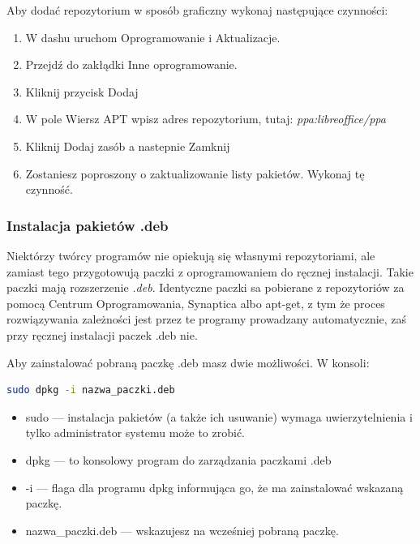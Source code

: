 Aby dodać repozytorium w sposób graficzny wykonaj następujące czynności:
\begin{enumerate}
\item W dashu uruchom \textcolor{ubuntu_orange}{Oprogramowanie i Aktualizacje}.
\item Przejdź do zakłądki \textcolor{ubuntu_orange}{Inne oprogramowanie}.
\item Kliknij przycisk \textcolor{ubuntu_orange}{Dodaj}
\item W pole \textcolor{ubuntu_orange}{Wiersz APT} wpisz adres repozytorium, tutaj: \textit{ppa:libreoffice/ppa}
\item Kliknij \textcolor{ubuntu_orange}{Dodaj zasób} a nastepnie \textcolor{ubuntu_orange}{Zamknij}
\item Zostaniesz poproszony o zaktualizowanie listy pakietów. Wykonaj tę czynność.
\end{enumerate}

\subsubsection{Instalacja pakietów .deb}
Niektórzy twórcy programów nie opiekują się własnymi repozytoriami, ale zamiast tego przygotowują paczki z oprogramowaniem do ręcznej instalacji. Takie paczki mają rozszerzenie \textit{.deb}. Identyczne paczki sa pobierane z repozytoriów za pomocą Centrum Oprogramowania, Synaptica albo apt-get, z tym że proces rozwiązywania zależności jest przez te programy prowadzany automatycznie, zaś przy ręcznej instalacji paczek .deb nie.

Aby zainstalować pobraną paczkę .deb masz dwie możliwości. W konsoli:
\begin{lstlisting}[language=bash]
sudo dpkg -i nazwa_paczki.deb
\end{lstlisting}
\begin{itemize}
\item \textcolor{ubuntu_orange}{sudo} --- instalacja pakietów (a także ich usuwanie) wymaga uwierzytelnienia i tylko administrator systemu może to zrobić.
\item \textcolor{ubuntu_orange}{dpkg} --- to konsolowy program do zarządzania paczkami .deb
\item \textcolor{ubuntu_orange}{-i} --- flaga dla programu dpkg informująca go, że ma zainstalować wskazaną paczkę.
\item \textcolor{ubuntu_orange}{nazwa\_paczki.deb} --- wskazujesz na wcześniej pobraną paczkę.
\end{itemize}

